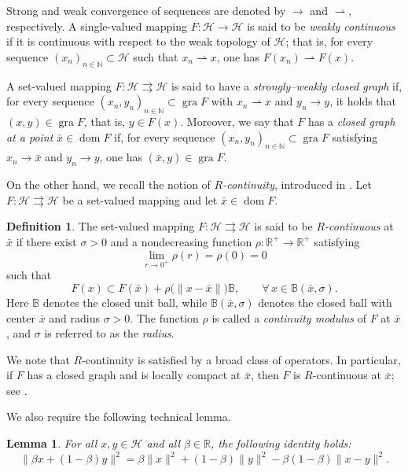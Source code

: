 \documentclass[11pt]{article}
\newtheorem{lemma}[theorem]{Lemma}
\theoremstyle{definition}
\newtheorem{definition}[theorem]{Definition}
\theoremstyle{definition}
\theoremstyle{definition}
\newcommand{\dom}{\ensuremath{\operatorname{dom}}}
\newcommand{\gra}{\ensuremath{\operatorname{gra}}}
\begin{document}
{Strong and weak convergence of sequences are denoted by \(\to\) and \(\rightharpoonup\), respectively. A single-valued mapping \(F:\mathcal{H}\to\mathcal{H}\) is said to be \emph{weakly continuous} if it is continuous with respect to the weak topology of \(\mathcal{H}\); that is, for every sequence \((x_n)_{n\in\mathbb{N}}\subset\mathcal{H}\) such that \(x_n\rightharpoonup x\), one has \(F(x_n)\rightharpoonup F(x)\).
}


{A set-valued mapping \(F:\mathcal{H}\rightrightarrows\mathcal{H}\) is said to have a \emph{strongly--weakly closed graph} if, for every sequence \((x_n,y_n)_{n\in\mathbb{N}}\subset\gra F\) with \(x_n\rightharpoonup x\) and \(y_n\to y\), it holds that \((x,y)\in\gra F\), that is, \(y\in F(x)\). Moreover, we say that \(F\) has a \emph{closed graph at a point} \(\bar x\in\dom F\) if, for every sequence \((x_n,y_n)_{n\in\mathbb{N}}\subset\gra F\) satisfying \(x_n\to \bar x\) and \(y_n\to y\), one has \((\bar x,y)\in\gra F\).
}

On the other hand, we recall the notion of \emph{\(R\)-continuity}, introduced in \cite{L1,LT}. Let \(F:\mathcal{H}\rightrightarrows\mathcal{H}\) be a set-valued mapping and let \(\bar x\in\dom F\).

{
\begin{definition}
The set-valued mapping \(F:\mathcal{H}\rightrightarrows\mathcal{H}\) is said to be \emph{\(R\)-continuous} at \(\bar x\) if there exist \(\sigma>0\) and a nondecreasing function \(\rho:\mathbb{R}^+\to\mathbb{R}^+\) satisfying
\[
\lim_{r\to 0^+}\rho(r)=\rho(0)=0
\]
such that
\begin{equation*}
F(x)\subset F(\bar x)+\rho\bigl(\|x-\bar x\|\bigr)\mathbb{B},
\qquad \forall\,x\in\mathbb{B}(\bar x,\sigma).
\end{equation*}
{Here $\mathbb{B}$ denotes the closed unit ball, while $\mathbb{B}(\bar x,\sigma)$ denotes the closed ball with center $\bar x$ and radius $\sigma> 0$}.
The function \(\rho\) is called a \emph{continuity modulus} of \(F\) at \(\bar x\), and \(\sigma\) is referred to as the \emph{radius}.
\end{definition}
}

We note that \(R\)-continuity is satisfied by a broad class of operators. In particular, if \(F\) has a closed graph and is locally compact at \(\bar x\), then \(F\) is \(R\)-continuous at \(\bar x\); see \cite[Theorem~3.2]{LT}.

We also require the following technical lemma.

{
\begin{lemma}\label{lem5-a}
For all \(x,y\in\mathcal{H}\) and all \(\beta\in\mathbb{R}\), the following identity holds:
\[
\|\beta x+(1-\beta)y\|^{2}
= \beta\|x\|^{2} + (1-\beta)\|y\|^{2}
- \beta(1-\beta)\|x-y\|^{2}.
\]
\end{lemma}
}
\end{document}
